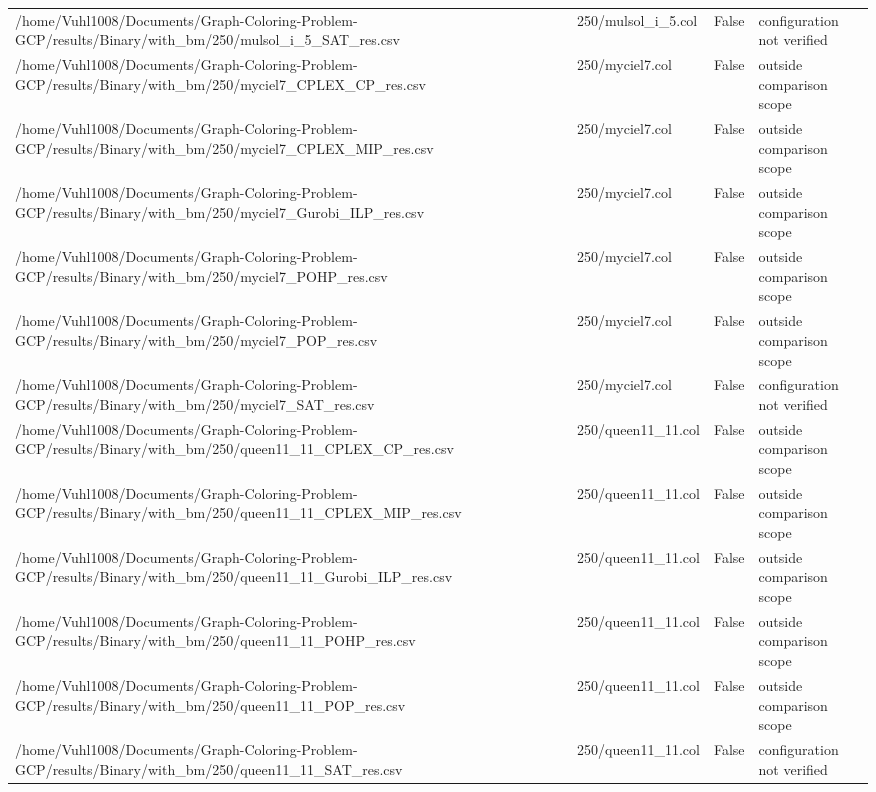 \begin{table}[htbp]
\begin{tabular}{llll}
/home/Vuhl1008/Documents/Graph-Coloring-Problem-GCP/results/Binary/with\_bm/250/mulsol\_i\_5\_SAT\_res.csv & 250/mulsol\_i\_5.col & False & configuration not verified \\
/home/Vuhl1008/Documents/Graph-Coloring-Problem-GCP/results/Binary/with\_bm/250/myciel7\_CPLEX\_CP\_res.csv & 250/myciel7.col & False & outside comparison scope \\
/home/Vuhl1008/Documents/Graph-Coloring-Problem-GCP/results/Binary/with\_bm/250/myciel7\_CPLEX\_MIP\_res.csv & 250/myciel7.col & False & outside comparison scope \\
/home/Vuhl1008/Documents/Graph-Coloring-Problem-GCP/results/Binary/with\_bm/250/myciel7\_Gurobi\_ILP\_res.csv & 250/myciel7.col & False & outside comparison scope \\
/home/Vuhl1008/Documents/Graph-Coloring-Problem-GCP/results/Binary/with\_bm/250/myciel7\_POHP\_res.csv & 250/myciel7.col & False & outside comparison scope \\
/home/Vuhl1008/Documents/Graph-Coloring-Problem-GCP/results/Binary/with\_bm/250/myciel7\_POP\_res.csv & 250/myciel7.col & False & outside comparison scope \\
/home/Vuhl1008/Documents/Graph-Coloring-Problem-GCP/results/Binary/with\_bm/250/myciel7\_SAT\_res.csv & 250/myciel7.col & False & configuration not verified \\
/home/Vuhl1008/Documents/Graph-Coloring-Problem-GCP/results/Binary/with\_bm/250/queen11\_11\_CPLEX\_CP\_res.csv & 250/queen11\_11.col & False & outside comparison scope \\
/home/Vuhl1008/Documents/Graph-Coloring-Problem-GCP/results/Binary/with\_bm/250/queen11\_11\_CPLEX\_MIP\_res.csv & 250/queen11\_11.col & False & outside comparison scope \\
/home/Vuhl1008/Documents/Graph-Coloring-Problem-GCP/results/Binary/with\_bm/250/queen11\_11\_Gurobi\_ILP\_res.csv & 250/queen11\_11.col & False & outside comparison scope \\
/home/Vuhl1008/Documents/Graph-Coloring-Problem-GCP/results/Binary/with\_bm/250/queen11\_11\_POHP\_res.csv & 250/queen11\_11.col & False & outside comparison scope \\
/home/Vuhl1008/Documents/Graph-Coloring-Problem-GCP/results/Binary/with\_bm/250/queen11\_11\_POP\_res.csv & 250/queen11\_11.col & False & outside comparison scope \\
/home/Vuhl1008/Documents/Graph-Coloring-Problem-GCP/results/Binary/with\_bm/250/queen11\_11\_SAT\_res.csv & 250/queen11\_11.col & False & configuration not verified \\

\end{tabular}
\end{table}
